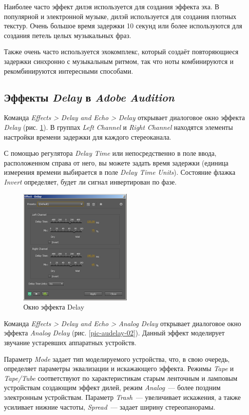 \documentclass[oneside, final, 14pt]{extreport}
\begin{document}
Наиболее часто эффект дилэя используется для создания эффекта эха. В популярной и электронной музыке, дилэй используется для создания плотных текстур. Очень большое время задержки 10 секунд или более используются для создания петель целых музыкальных фраз.

Также очень часто используется эхокомплекс, который создаёт повторяющиеся задержки синхронно с музыкальным ритмом, так что ноты комбинируются и рекомбинируются интересными способами.

\subsection{Эффекты \emph{Delay} в \emph{Adobe Audition}}
Команда \emph{Effects > Delay and Echo > Delay} открывает диалоговое окно эффекта \emph{Delay} (рис. \ref{pic-audelay-01}). В группах \emph{Left Channel} и \emph{Right Channel} находятся элементы настройки времени задержки для каждого стереоканала.

С помощью регулятора \emph{Delay Time} или непосредственно в поле ввода, расположенном справа от него, вы можете задать время задержки (единица измерения времени выбирается в поле \emph{Delay Time Units}). Состояние флажка \emph{Invert} определяет, будет ли сигнал инвертирован по фазе.

\begin{figure}[h!]
  \centering
  \includegraphics[width=0.5\textwidth]{pic-audelay-01}
  \caption{Окно эффекта Delay}
  \label{pic-audelay-01}
\end{figure}

Команда \emph{Effects > Delay and Echo > Analog Delay} открывает диалоговое окно эффекта \emph{Analog Delay} (рис. \ref{pic-audelay-02}). Данный эффект моделирует звучание устаревших аппаратных устройств.

Параметр \emph{Mode} задает тип моделируемого устройства, что, в свою очередь, определяет параметры эквализации и искажающего эффекта. Режимы \emph{Tape} и \emph{Tape/Tube} соответствуют по характеристикам старым ленточным и ламповым устройствам создающим эффект дилей, режим \emph{Analog}~--- более поздним электронным устройствам. Параметр \emph{Trash}~--- увеличивает искажения, а также усиливает нижние частоты, \emph{Spread}~--- задает ширину стереопанорамы.
\end{document}
